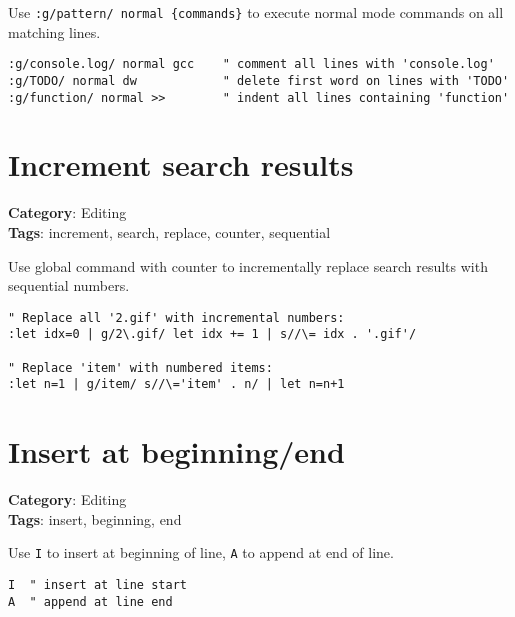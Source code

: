 {{{{{Use {\footnotesize \Verb§:g/pattern/ normal {commands}§} to execute normal mode commands on all matching lines.

\begin{Exa*}{}
\begin{Verbatim}[fontsize=\footnotesize, breaklines, breakanywhere]
:g/console.log/ normal gcc    " comment all lines with 'console.log'
:g/TODO/ normal dw            " delete first word on lines with 'TODO'
:g/function/ normal >>        " indent all lines containing 'function'
\end{Verbatim}
\end{Exa*}

\section{Increment search results}

\textbf{Category}: Editing\\ \textbf{Tags}: increment, search, replace, counter, sequential
\vspace{0.5cm}

Use global command with counter to incrementally replace search results with sequential numbers.

\begin{Exa*}{}
\begin{Verbatim}[fontsize=\footnotesize, breaklines, breakanywhere]
" Replace all '2.gif' with incremental numbers:
:let idx=0 | g/2\.gif/ let idx += 1 | s//\= idx . '.gif'/

" Replace 'item' with numbered items:
:let n=1 | g/item/ s//\='item' . n/ | let n=n+1
\end{Verbatim}
\end{Exa*}

\section{Insert at beginning/end}

\textbf{Category}: Editing\\ \textbf{Tags}: insert, beginning, end
\vspace{0.5cm}

Use {\footnotesize \Verb§I§} to insert at beginning of line, {\footnotesize \Verb§A§} to append at end of line.

\begin{Exa*}{}
\begin{Verbatim}[fontsize=\footnotesize, breaklines, breakanywhere]
I  " insert at line start
A  " append at line end
\end{Verbatim}
\end{Exa*}

}}}}}
